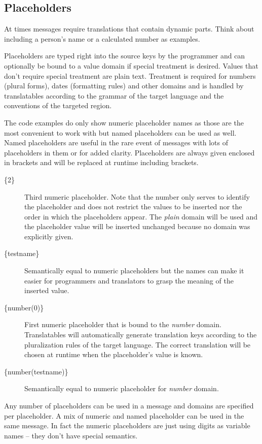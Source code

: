 \documentclass[a4paper,11pt,twoside]{report}
\begin{document}
\subsection{Placeholders}
At times messages require translations that contain dynamic parts. Think about including a person's name or a calculated number as examples.

Placeholders are typed right into the source keys by the programmer and can optionally be bound to a value domain if special treatment is desired. Values that don't require special treatment are plain text. Treatment is required for numbers (plural forms), dates (formatting rules) and other domains and is handled by translatables according to the grammar of the target language and the conventions of the targeted region.

The code examples do only show numeric placeholder names as those are the most convenient to work with but named placeholders can be used as well. Named placeholders are useful in the rare event of messages with lots of placeholders in them or for added clarity. Placeholders are always given enclosed in brackets and will be replaced at runtime including brackets.

\begin{description}
	\item[\{2\}] Third numeric placeholder. Note that the number only serves to identify the placeholder and does not restrict the values to be inserted nor the order in which the placeholders appear. The \textit{plain} domain will be used and the placeholder value will be inserted unchanged because no domain was explicitly given.
	\item[\{testname\}] Semantically equal to numeric placeholders but the names can make it easier for programmers and translators to grasp the meaning of the inserted value.
	\item[\{number(0)\}] First numeric placeholder that is bound to the \textit{number} domain. Translatables will automatically generate translation keys according to the pluralization rules of the target language. The correct translation will be chosen at runtime when the placeholder's value is known.
	\item[\{number(testname)\}] Semantically equal to numeric placeholder for \textit{number} domain.
\end{description}

Any number of placeholders can be used in a message and domains are specified per placeholder. A mix of numeric and named placeholder can be used in the same message. In fact the numeric placeholders are just using digits as variable names – they don't have special semantics.
\end{document}

